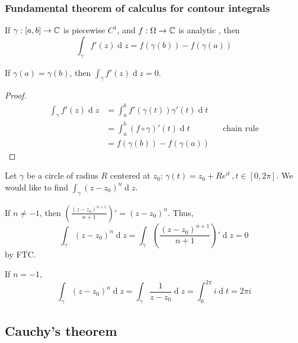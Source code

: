 \documentclass[12pt]{article}
\renewcommand{\d}{\ensuremath{\operatorname{d}}}
\begin{document}
\subsubsection{Fundamental theorem of calculus for contour integrals}
If $\gamma:[a,b]\to\mathbb{C}$ is piecewise $C^1$, and $f:\Omega\to \mathbb{C}$ is analytic ,
then \[\int_{\gamma}f'(z)\d z=f(\gamma(b))-f(\gamma(a))\]

If $\gamma(a)=\gamma(b)$, then $\int_{\gamma}f'(z)\d z=0$.

\begin{proof}
    \begin{align*}
        \int_{\gamma}f'(z)\d z&= \int_{a}^{b}f'(\gamma(t))\gamma'(t)\d t\\
        &= \int_{a}^{b}(f\circ \gamma)'(t)\d t &&\text{chain rule}\\
        &= f(\gamma(b))-f(\gamma(a))
    \end{align*}
\end{proof}

\eg Let $\gamma$ be a circle of radius $R$ centered at $z_0$: $\gamma(t)=z_0+Re^{it}\, ,t\in [0,2\pi]$. We would like to find \(\int_{\gamma}(z-z_0)^n\d z\).

If $n\neq -1$, then $\left(\frac{(z-z_0)^{n+1}}{n+1}\right)' = (z-z_0)^n$. Thus, \[\int_{\gamma}(z-z_0)^n\d z = \int_{\gamma}\left(\frac{(z-z_0)^{n+1}}{n+1}\right)'\d z =0\] by FTC. 

If $n=-1$, \[\int_{\gamma}(z-z_0)^n\d z= \int_{\gamma}\frac{1}{z-z_0}\d z = \int_{0}^{2\pi}i\d t=2\pi i\]

\subsection{Cauchy's theorem}
\end{document}
